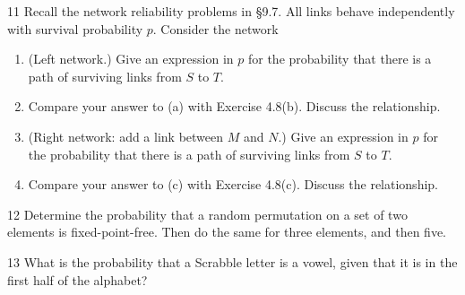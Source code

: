 \begin{exercise}{11}
    Recall the network reliability problems in \S9.7. All links behave
    independently with survival probability $p$. Consider the network
    \begin{center}
    \end{center}
    \begin{enumerate}[label=(\alph*)]
        \item (Left network.) Give an expression in $p$ for the probability that
              there is a path of surviving links from $S$ to $T$.
        \item Compare your answer to (a) with Exercise 4.8(b). Discuss the
              relationship.
        \item (Right network: add a link between $M$ and $N$.) Give an expression
              in $p$ for the probability that there is a path of surviving links
              from $S$ to $T$.
        \item Compare your answer to (c) with Exercise 4.8(c). Discuss the
              relationship.
    \end{enumerate}
\end{exercise}

\begin{exercise}{12}
    Determine the probability that a random permutation on a set of two elements
    is fixed-point-free. Then do the same for three elements, and then five.
\end{exercise}

\begin{exercise}{13}
    What is the probability that a Scrabble letter is a vowel, given that it is
    in the first half of the alphabet?
\end{exercise}

